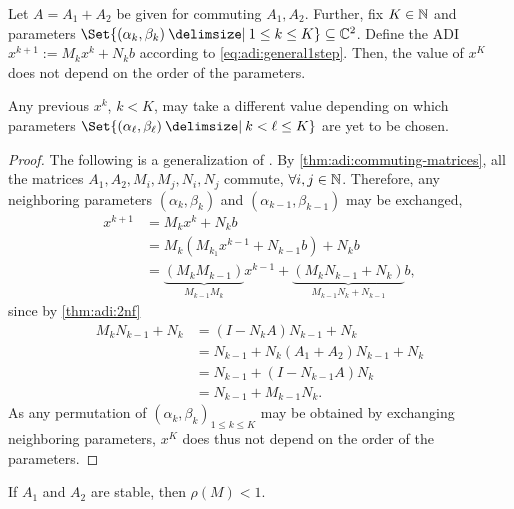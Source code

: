 \begin{proposition}
  Let $A=A_1 + A_2$ be given for commuting $A_1,A_2$.
  Further, fix $K\in\mathbb{N}$ and parameters $\Set{(\alpha_k, \beta_k) \given 1 \leq k \leq K} \subseteq \C^2$.
  Define the \ac{ADI} $x^{k+1} := M_k x^k + N_k b$ according to \eqref{eq:adi:general1step}.
  Then, the value of $x^K$ does not depend on the order of the parameters.
\end{proposition}
\begin{remark}
  Any previous $x^k$, $k < K$, may take a different value depending on which parameters
  $\Set{(\alpha_\ell,\beta_\ell) \given k < \ell \leq K}$ are yet to be chosen.
\end{remark}
\begin{proof}
  The following is a generalization of \cite[proof of Theorem~4.1]{Li2002}.
  By \autoref{thm:adi:commuting-matrices}, all the matrices $A_1, A_2, M_i, M_j, N_i, N_j$ commute, $\forall i,j\in\mathbb{N}$.
  Therefore, any neighboring parameters $(\alpha_k,\beta_k)$ and $(\alpha_{k-1},\beta_{k-1})$ may be exchanged,
  \begin{align*}
    x^{k+1}
    &= M_k x^k + N_k b \\
    &= M_k (M_{k_1} x^{k-1} + N_{k-1} b) + N_k b \\
    &= \underbrace{
      (M_k M_{k-1})
    }_{
      M_{k-1} M_k
    } x^{k-1} + \underbrace{
      (M_k N_{k-1} + N_k)
    }_{
      M_{k-1} N_k + N_{k-1}
    } b
    ,
  \end{align*}
  since by \autoref{thm:adi:2nf}
  \begin{align*}
    M_k N_{k-1} + N_k
    &= (I - N_k A)N_{k-1} + N_k \\
    &= N_{k-1} + N_k (A_1+A_2) N_{k-1} + N_k \\
    &= N_{k-1} + (I - N_{k-1} A) N_k \\
    &= N_{k-1} + M_{k-1} N_k
    .
  \end{align*}
  As any permutation of $(\alpha_k,\beta_k)_{1\leq k \leq K}$ may be obtained by exchanging neighboring parameters,
  $x^K$ does thus not depend on the order of the parameters.
\end{proof}


\begin{hypothesis}
\label{thm:adi:convergence}
  If $A_1$ and $A_2$ are stable, then $\rho(M) < 1$.
\end{hypothesis}

